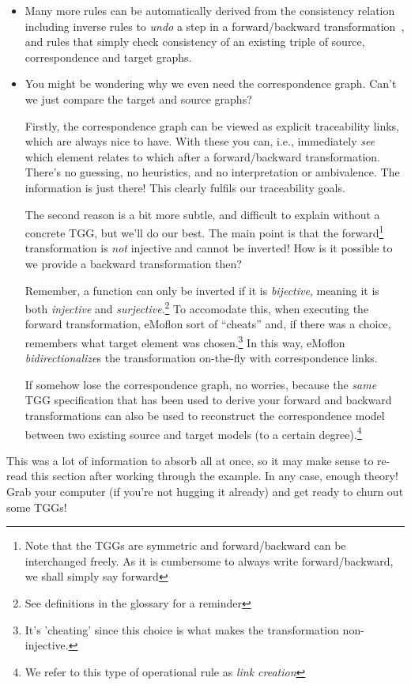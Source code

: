 \begin{itemize}

\item Many more rules can be automatically derived from the consistency relation including inverse rules to \emph{undo} a step in a forward/backward
transformation~\cite{LAVS_ICGT_2012}, and rules that simply check consistency of an existing triple of source, correspondence and target graphs.

\item You might be wondering why we even need the correspondence graph. Can't we just compare the target and source graphs? 

Firstly, the correspondence graph can be viewed as explicit traceability links, which are always nice to have. With these you can, i.e., immediately \emph{see}
which element relates to which after a forward/backward transformation. There's no guessing, no heuristics, and no interpretation or ambivalence. The
information is just there! This clearly fulfils our traceability goals.

The second reason is a bit more subtle, and difficult to explain without a concrete TGG, but we'll do our best. The main point is that the forward\footnote{Note
that the TGGs are symmetric and forward/backward can be interchanged freely.  As it is cumbersome to always write forward/backward, we shall simply say
forward} transformation is \emph{not} injective and cannot be inverted! How is it possible to we provide a backward transformation then?

Remember, a function can only be inverted if it is \emph{bijective}, meaning it is both \emph{injective} and \emph{surjective}.\footnote{See definitions in the
glossary for a reminder} To accomodate this, when executing the forward transformation, eMoflon sort of ``cheats'' and, if there was a choice, remembers what
target element was chosen.\footnote{It's 'cheating' since this choice is what makes the transformation non-injective.} In this way,
eMoflon \emph{bidirectionalize}s the transformation on-the-fly with correspondence links.  

If somehow lose the correspondence graph, no worries, because the \emph{same} TGG specification that has been used to derive your forward and backward
transformations can also be used to reconstruct the correspondence model between two existing source and target models (to a certain degree).\footnote{We refer
to this type of operational rule as \emph{link creation}}

\end{itemize}
This was a lot of information to absorb all at once, so it may make sense to re-read this section after working through the example. In any case, enough theory!
Grab your computer (if you're not hugging it already) and get ready to churn out some TGGs!
